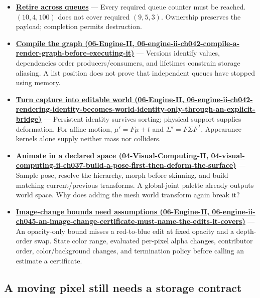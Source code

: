 \begin{itemize}
\item
  \textbf{\hyperref[01-foundations-i-ch011-retire-a-resource-after-every-user-not-after-one-convenient-clock]{Retire across queues}} --- Every required queue counter must be reached. \((10,4,100)\) does not cover required \((9,5,3)\). Ownership preserves the payload; completion permits destruction.
\item
  \textbf{\href{../06-Engine-II/main.pdf\#nameddest=06-engine-ii-ch042-compile-a-render-graph-before-executing-it}{Compile the graph (06-Engine-II, 06-engine-ii-ch042-compile-a-render-graph-before-executing-it)}} --- Versions identify values, dependencies order producers/consumers, and lifetimes constrain storage aliasing. A list position does not prove that independent queues have stopped using memory.
\item
  \textbf{\href{../06-Engine-II/main.pdf\#nameddest=06-engine-ii-ch042-rendering-identity-becomes-world-identity-only-through-an-explicit-bridge}{Turn capture into editable world (06-Engine-II, 06-engine-ii-ch042-rendering-identity-becomes-world-identity-only-through-an-explicit-bridge)}} --- Persistent identity survives sorting; physical support supplies deformation. For affine motion, \(\mu'=F\mu+t\) and \(\Sigma'=F\Sigma F^T\). Appearance kernels alone supply neither mass nor colliders.
\item
  \textbf{\href{../04-Visual-Computing-II/main.pdf\#nameddest=04-visual-computing-ii-ch037-build-a-pose-first-then-deform-the-surface}{Animate in a declared space (04-Visual-Computing-II, 04-visual-computing-ii-ch037-build-a-pose-first-then-deform-the-surface)}} --- Sample pose, resolve the hierarchy, morph before skinning, and build matching current/previous transforms. A global-joint palette already outputs world space. Why does adding the mesh world transform again break it?
\item
  \textbf{\href{../06-Engine-II/main.pdf\#nameddest=06-engine-ii-ch045-an-image-change-certificate-must-name-the-edits-it-covers}{Image-change bounds need assumptions (06-Engine-II, 06-engine-ii-ch045-an-image-change-certificate-must-name-the-edits-it-covers)}} --- An opacity-only bound misses a red-to-blue edit at fixed opacity and a depth-order swap. State color range, evaluated per-pixel alpha changes, contributor order, color/background changes, and termination policy before calling an estimate a certificate.
\end{itemize}

\subsection{A moving pixel still needs a storage contract}\label{appendix-a8f634b076b5-a-moving-pixel-still-needs-a-storage-contract}

